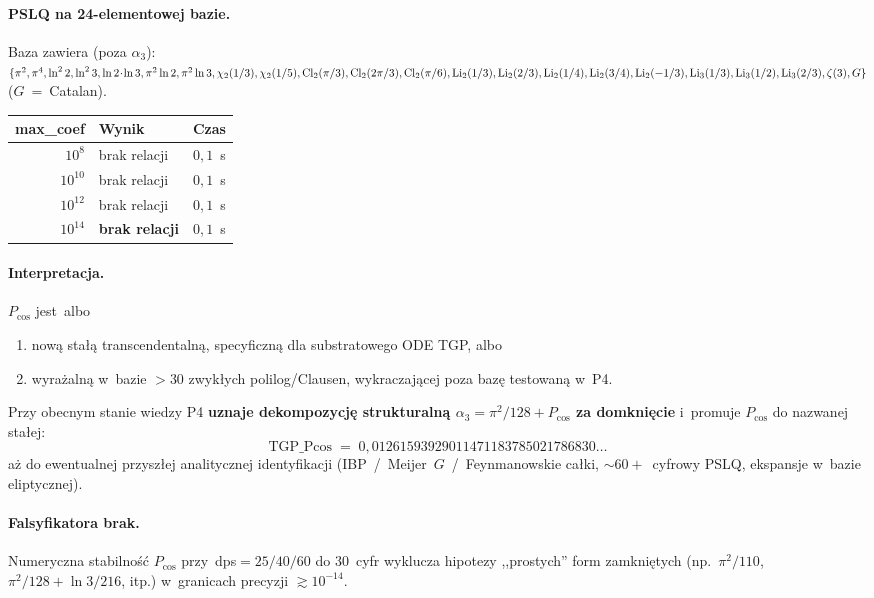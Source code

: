 \paragraph{PSLQ na 24-elementowej bazie.}
Baza zawiera (poza $\alpha_3$):
$\{\pi^2,\pi^4,\ln^2 2,\ln^2 3,\ln 2\!\cdot\!\ln 3,\pi^2\ln 2,\pi^2\ln 3,
\chi_2(1/3),\chi_2(1/5),\operatorname{Cl}_2(\pi/3),\operatorname{Cl}_2(2\pi/3),\operatorname{Cl}_2(\pi/6),
\operatorname{Li}_2(1/3),\operatorname{Li}_2(2/3),\operatorname{Li}_2(1/4),\operatorname{Li}_2(3/4),\operatorname{Li}_2(-1/3),
\operatorname{Li}_3(1/3),\operatorname{Li}_3(1/2),\operatorname{Li}_3(2/3),\zeta(3), G\}$
($G$~=~Catalan).

\begin{center}\footnotesize
\begin{tabular}{@{}rll@{}}
\toprule
max\_coef & Wynik & Czas \\
\midrule
$10^{8}$  & brak relacji & $0{,}1$~s \\
$10^{10}$ & brak relacji & $0{,}1$~s \\
$10^{12}$ & brak relacji & $0{,}1$~s \\
$10^{14}$ & \textbf{brak relacji} & $0{,}1$~s \\
\bottomrule
\end{tabular}
\end{center}

\paragraph{Interpretacja.}
$P_{\cos}$ jest~albo
\begin{enumerate}[nosep]
  \item[(i)] now\k{a} sta\l{}\k{a} transcendentaln\k{a}, specyficzn\k{a} dla substratowego
    ODE TGP, albo
  \item[(ii)] wyra\.zaln\k{a} w~bazie $> 30$ zwyk\l{}ych polilog/Clausen, wy\-kracza\-j\k{a}cej
    poza baz\k{e} testowan\k{a} w~P4.
\end{enumerate}
Przy obecnym stanie wiedzy P4 \textbf{uznaje dekompozycj\k{e}
strukturaln\k{a} $\alpha_3 = \pi^2/128 + P_{\cos}$ za domkni\k{e}cie}
i~promuje $P_{\cos}$ do nazwanej sta\l{}ej:
\begin{equation}
  \boxed{\;\mathrm{TGP\_Pcos}
   \;=\; 0{,}01261593929011471183785021786830\ldots\;}
  \label{eq:P4-Pcos-named}
\end{equation}
a\.z do ewentualnej przysz\l{}ej analitycznej identyfikacji
(IBP~/~Meijer~$G$~/~Feynmanowskie ca\l{}ki, $\sim 60+$~cyfrowy PSLQ,
ekspansje w~bazie eliptycznej).

\paragraph{Falsyfikatora brak.}
Numeryczna stabilno\'s\'c $P_{\cos}$ przy~dps$=25/40/60$ do 30~cyfr
wyklucza hipotezy ,,prostych'' form zamkni\k{e}tych
(np.\ $\pi^2/110$, $\pi^2/128 + \ln 3/216$, itp.)
w~granicach precyzji $\gtrsim 10^{-14}$.

